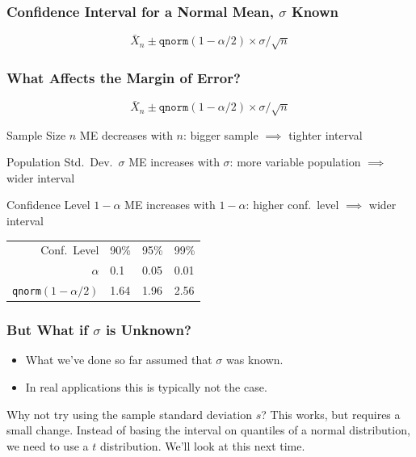 \documentclass[handout]{beamer}
\begin{document}
\begin{frame}
\frametitle{Confidence Interval for a Normal Mean, $\sigma$ Known}
\Large
$$\boxed{\bar{X}_n \pm \texttt{qnorm}(1-\alpha/2) \times \sigma/\sqrt{n}}$$
\end{frame}
\begin{frame}
\frametitle{What Affects the Margin of Error?}

	$$\boxed{\bar{X}_n \pm \texttt{qnorm}(1-\alpha/2) \times \sigma/\sqrt{n}}$$


	
\begin{block}{Sample Size $n$}
ME decreases with $n$: bigger sample $\implies$ tighter interval
\end{block}


\begin{block}{Population Std.\ Dev.\ $\sigma$}
ME increases with $\sigma$: more variable population $\implies$ wider interval
\end{block}



\begin{block}{Confidence Level $1-\alpha$}
ME increases with $1-\alpha$: higher conf.\ level $\implies$ wider interval

\pause

\begin{center}
	\small
	\begin{tabular}{r|lll}
	\hline
	Conf.\ Level & 90\% & 95\% & 99\% \\
	$\alpha$ & 0.1 & 0.05 & 0.01\\
	\texttt{qnorm}$(1-\alpha/2)$&1.64 & 1.96 & 2.56\\
	\hline
	\end{tabular}
	\end{center}
\end{block}	
\end{frame}

\begin{frame}
\frametitle{But What if $\sigma$ is Unknown?}
	\begin{itemize}
		\item What we've done so far assumed that $\sigma$ was known. 
		\item In real applications this is typically not the case. 
	\end{itemize}

\begin{alertblock}{Why not try using the sample standard deviation $s$?}
This works, but requires a small change. Instead of basing the interval on quantiles of a normal distribution, we need to use a $t$ distribution. We'll look at this next time.
\end{alertblock}

\end{frame}
\end{document}

